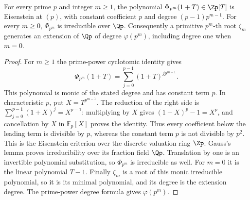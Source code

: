\begin{lemma}
\label{ft:padic-cyclotomic-polynomial}
\leanok
For every prime $p$ and integer $m\geq1$, the polynomial
$\Phi_{p^m}(1+T)\in\Zp[T]$ is Eisenstein at $(p)$, with constant
coefficient $p$ and degree $(p-1)p^{m-1}$.
For every $m\geq0$, $\Phi_{p^m}$ is irreducible over $\Qp$.
Consequently a primitive $p^m$-th root $\zeta_m$ generates an extension
of $\Qp$ of degree $\varphi(p^m)$, including degree one when $m=0$.
\end{lemma}
\begin{proof}
For $m\geq1$ the prime-power cyclotomic identity gives
\[
 \Phi_{p^m}(1+T)=\sum_{j=0}^{p-1}(1+T)^{jp^{m-1}}.
\]
This polynomial is monic of the stated degree and has constant term
$p$. In characteristic $p$, put $X=T^{p^{m-1}}$. The reduction of
the right side is $\sum_{j=0}^{p-1}(1+X)^j=X^{p-1}$:
multiplying by $X$ gives $(1+X)^p-1=X^p$, and cancellation by
$X$ in $\mathbb F_p[X]$ proves the identity. Thus every coefficient
below the leading term is divisible by $p$, whereas the constant
term $p$ is not divisible by $p^2$. This is the Eisenstein criterion
over the discrete valuation ring $\Zp$. Gauss's lemma proves
irreducibility over its fraction field $\Qp$. Translation by one
is an invertible polynomial substitution, so $\Phi_{p^m}$ is
irreducible as well. For $m=0$ it is the linear polynomial $T-1$.
Finally $\zeta_m$ is a root of this monic irreducible polynomial,
so it is its minimal polynomial, and its degree is the extension
degree. The prime-power degree formula gives $\varphi(p^m)$.
\end{proof}

